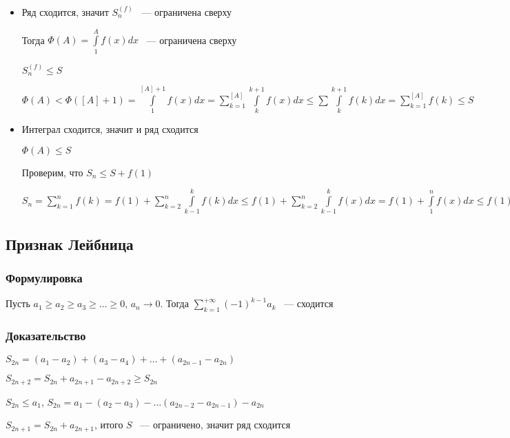 \documentclass[../main.tex]{subfiles}
\begin{document}
            \begin{itemize}
            
            \item Ряд сходится, значит $S^{(f)}_n$ ~--- ограничена сверху
            
                Тогда $\Phi(A) = \int\limits^A_1 f(x) dx$ ~--- ограничена сверху
            
                $S^{(f)}_n \leq S$
            
                $\Phi(A) < \Phi([A] + 1) = \int\limits^{[A] + 1}_1 f(x) dx = \sum\limits^{[A]}_{k = 1} \int\limits^{k + 1}_k f(x)dx \leq \sum \int\limits^{k + 1}_k f(k) dx = \sum\limits^{[A]}_{k = 1} f(k) \leq S$
            
            \item Интеграл сходится, значит и ряд сходится
            
                $\Phi(A) \leq S$
            
                Проверим, что $S_n \leq S + f(1)$
            
                $S_n = \sum\limits^n_{k = 1} f(k) = f(1) + \sum\limits^n_{k = 2} \int\limits^k_{k - 1} f(k) dx \leq f(1) + \sum\limits^n_{k = 2} \int\limits^k_{k - 1} f(x) dx = f(1) + \int\limits^n_1 f(x) dx \leq f(1) + S$
                
            \end{itemize}
\newpage


\subsection{Признак Лейбница}
 \subsubsection*{Формулировка}
        
            Пусть $a_1 \geq a_2 \geq a_3 \geq \ldots \geq 0$, $a_n \rightarrow 0$. Тогда $\sum\limits^{+\infty}_{k = 1} (-1)^{k - 1} a_k$ ~--- сходится
            
        \subsubsection*{Доказательство}
        
            $S_{2n} = (a_1 - a_2) + (a_3 - a_4) + \ldots + (a_{2n - 1} - a_{2n})$
            
            $S_{2n + 2} = S_{2n} + a_{2n + 1} - a_{2n + 2} \geq S_{2n}$
            
            $S_{2n} \leq a_1$, $S_{2n} = a_1 - (a_2 - a_3) - \ldots (a_{2n - 2} - a_{2n - 1}) - a_{2n}$
            
            $S_{2n + 1} = S_{2n} + a_{2n + 1}$, итого $S$ ~--- ограничено, значит ряд сходится
\newpage
\end{document}
